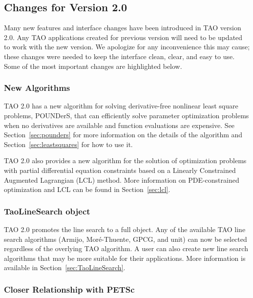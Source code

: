 \subsection*{Changes for Version 2.0}

Many new features and interface changes have been introduced in TAO version 2.0.
Any TAO applications created for previous version will need to be updated to 
work with the new version.  We apologize for any inconvenience this may
cause; these changes were needed to keep the interface
clean, 
clear, and easy to use. Some of the most important changes are highlighted 
below.

\subsubsection*{New Algorithms}

TAO 2.0 has a new algorithm for solving derivative-free nonlinear least
square 
problems, POUNDerS, that can efficiently solve parameter optimization problems 
when no derivatives are available and function evaluations are expensive. 
See 
Section~\ref{sec:pounders} for more information on the details of the 
algorithm and Section~\ref{sec:leastsquares} for how to use it.

TAO 2.0 also provides a new algorithm for the solution of optimization
problems with partial differential equation constraints based on a
Linearly Constrained Augmented Lagrangian (LCL) method.  More 
information on PDE-constrained optimization and LCL can be found 
in Section~\ref{sec:lcl}.

\subsubsection*{TaoLineSearch object}

TAO 2.0 promotes the line search to a full object.  Any of the available 
TAO line search algorithms (Armijo, Mor\'e-Thuente, GPCG, and unit) can now 
be selected regardless of the overlying TAO algorithm.  A user can also
create new line search algorithms that may be more suitable for their
applications.  More information is available in 
Section~\ref{sec:TaoLineSearch}.

\subsubsection*{Closer Relationship with PETSc}

